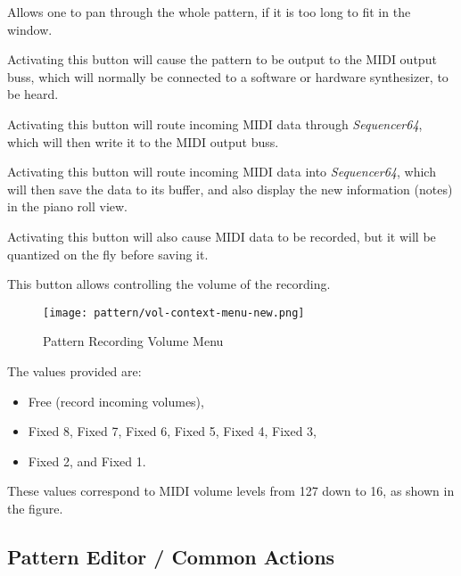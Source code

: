    Allows one to pan through the whole pattern, if it is too long to fit in
   the window.

   Activating this button will cause the pattern to be output to the MIDI
   output buss, which will normally be connected to a software or hardware
   synthesizer, to be heard.

   Activating this button will route incoming MIDI data through
   \textsl{Sequencer64}, which will then write it to the MIDI output buss.

   Activating this button will route incoming MIDI data into
   \textsl{Sequencer64}, which will then save the data to its buffer, and also
   display the new information (notes) in the piano roll view.

   Activating this button will also cause MIDI data to be recorded, but it
   will be quantized on the fly before saving it.

   This button allows controlling the volume of the recording.

\begin{figure}[H]
   \centering 
   \texttt{[image: pattern/vol-context-menu-new.png]}
   \caption{Pattern Recording Volume Menu}
   \label{fig:pattern_edit_recording_volume_menu}
\end{figure}

   The values provided are:

   \begin{itemize}
      \item Free (record incoming volumes),
      \item Fixed 8, Fixed 7, Fixed 6, Fixed 5, Fixed 4, Fixed 3,
      \item Fixed 2, and Fixed 1.
   \end{itemize}

   These values correspond to MIDI volume levels from 127 down to 16, as
   shown in the figure.

\subsection{Pattern Editor / Common Actions}
\label{subsec:seq64_pattern_editor_common}

